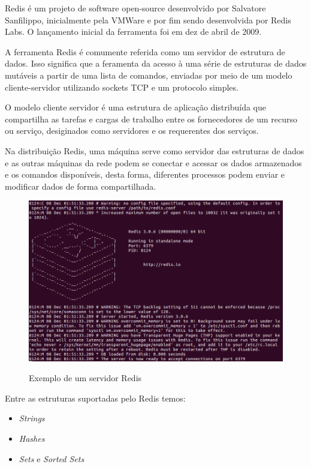 \documentclass[10pt]{IEEEtran}
\begin{document}
Redis é um projeto de software open-source desenvolvido por Salvatore Sanfilippo, inicialmente pela VMWare e por fim sendo desenvolvida por Redis Labs. O lançamento inicial da ferramenta foi em dez de abril de 2009.

A ferramenta Redis é comumente referida como um servidor de estrutura de dados. Isso significa que a feramenta da acesso à uma série de estruturas de dados mutáveis a partir de uma lista de comandos, enviadas por meio de um modelo cliente-servidor utilizando sockets TCP e um protocolo simples.

O modelo cliente servidor é uma estrutura de aplicação distribuída que compartilha as tarefas e cargas de trabalho entre os fornecedores de um recurso ou serviço, desiginados como servidores e os requerentes dos serviços.

Na distribuição Redis, uma máquina serve como servidor das estruturas de dados e as outras máquinas da rede podem se conectar e acessar os dados armazenados e os comandos disponíveis, desta forma, diferentes processos podem enviar e modificar dados de forma compartilhada.


\begin{figure}
	\includegraphics[scale=0.35]{server.png}
	\label{fig:server}
    \caption{Exemplo de um servidor Redis}
\end{figure}

Entre as estruturas suportadas pelo Redis temos:
\begin{itemize}
\item \textit{Strings}
\item \textit{Hashes}
\item \textit{Sets} e \textit{Sorted Sets}
\end{itemize}
\end{document}
